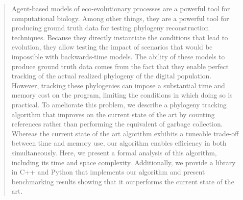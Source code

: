 \begin{abstract}

Agent-based models of eco-evolutionary processes are a powerful tool for computational biology.
Among other things, they are a powerful tool for producing ground truth data for testing phylogeny reconstruction techniques.
Because they directly instantiate the conditions that lead to evolution, they allow testing the impact of scenarios that would be impossible with backwards-time models.
The ability of these models to produce ground truth data comes from the fact that they enable perfect tracking of the actual realized phylogeny of the digital population.
However, tracking these phylogenies can impose a substantial time and memory cost on the program, limiting the conditions in which doing so is practical.
To ameliorate this problem, we describe a phylogeny tracking algorithm that improves on the current state of the art by counting references rather than performing the equivalent of garbage collection.
Whereas the current state of the art algorithm exhibits a tuneable trade-off between time and memory use, our algorithm enables efficiency in both simultaneously. 
Here, we present a formal analysis of this algorithm, including its time and space complexity.
Additionally, we provide a library in C++ and Python that implements our algorithm and present benchmarking results showing that it outperforms the current state of the art.



\end{abstract}
